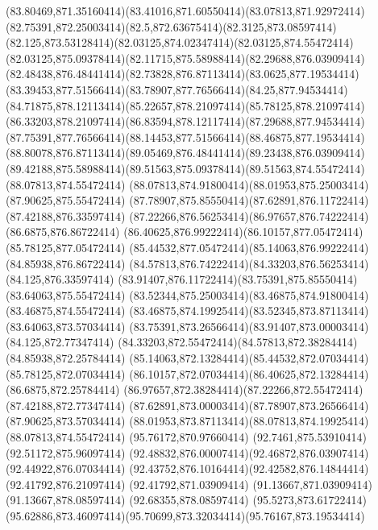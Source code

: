 {{	\curveto(83.80469,871.35160414)(83.41016,871.60550414)(83.07813,871.92972414)
	\curveto(82.75391,872.25003414)(82.5,872.63675414)(82.3125,873.08597414)
	\curveto(82.125,873.53128414)(82.03125,874.02347414)(82.03125,874.55472414)
	\curveto(82.03125,875.09378414)(82.11715,875.58988414)(82.29688,876.03909414)
	\curveto(82.48438,876.48441414)(82.73828,876.87113414)(83.0625,877.19534414)
	\curveto(83.39453,877.51566414)(83.78907,877.76566414)(84.25,877.94534414)
	\curveto(84.71875,878.12113414)(85.22657,878.21097414)(85.78125,878.21097414)
	\curveto(86.33203,878.21097414)(86.83594,878.12117414)(87.29688,877.94534414)
	\curveto(87.75391,877.76566414)(88.14453,877.51566414)(88.46875,877.19534414)
	\curveto(88.80078,876.87113414)(89.05469,876.48441414)(89.23438,876.03909414)
	\curveto(89.42188,875.58988414)(89.51563,875.09378414)(89.51563,874.55472414)
	\closepath
	\moveto(88.07813,874.55472414)
	\curveto(88.07813,874.91800414)(88.01953,875.25003414)(87.90625,875.55472414)
	\curveto(87.78907,875.85550414)(87.62891,876.11722414)(87.42188,876.33597414)
	\curveto(87.22266,876.56253414)(86.97657,876.74222414)(86.6875,876.86722414)
	\curveto(86.40625,876.99222414)(86.10157,877.05472414)(85.78125,877.05472414)
	\curveto(85.44532,877.05472414)(85.14063,876.99222414)(84.85938,876.86722414)
	\curveto(84.57813,876.74222414)(84.33203,876.56253414)(84.125,876.33597414)
	\curveto(83.91407,876.11722414)(83.75391,875.85550414)(83.64063,875.55472414)
	\curveto(83.52344,875.25003414)(83.46875,874.91800414)(83.46875,874.55472414)
	\curveto(83.46875,874.19925414)(83.52345,873.87113414)(83.64063,873.57034414)
	\curveto(83.75391,873.26566414)(83.91407,873.00003414)(84.125,872.77347414)
	\curveto(84.33203,872.55472414)(84.57813,872.38284414)(84.85938,872.25784414)
	\curveto(85.14063,872.13284414)(85.44532,872.07034414)(85.78125,872.07034414)
	\curveto(86.10157,872.07034414)(86.40625,872.13284414)(86.6875,872.25784414)
	\curveto(86.97657,872.38284414)(87.22266,872.55472414)(87.42188,872.77347414)
	\curveto(87.62891,873.00003414)(87.78907,873.26566414)(87.90625,873.57034414)
	\curveto(88.01953,873.87113414)(88.07813,874.19925414)(88.07813,874.55472414)
	\closepath
	\moveto(95.76172,870.97660414)
	\lineto(92.7461,875.53910414)
	\lineto(92.51172,875.96097414)
	\curveto(92.48832,876.00007414)(92.46872,876.03907414)(92.44922,876.07034414)
	\curveto(92.43752,876.10164414)(92.42582,876.14844414)(92.41792,876.21097414)
	\lineto(92.41792,871.03909414)
	\lineto(91.13667,871.03909414)
	\lineto(91.13667,878.08597414)
	\lineto(92.68355,878.08597414)
	\lineto(95.5273,873.61722414)
	\curveto(95.62886,873.46097414)(95.70699,873.32034414)(95.76167,873.19534414)
}}
